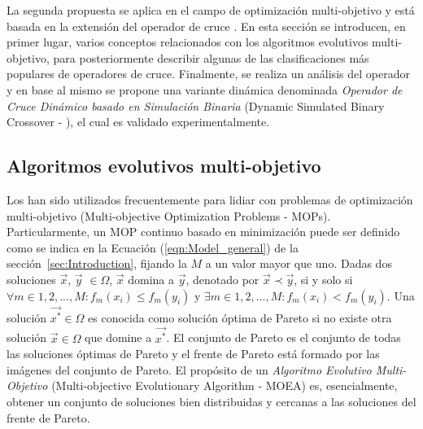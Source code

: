 La segunda propuesta se aplica en el campo de optimización multi-objetivo y está basada en la extensión del operador de
cruce \SBX{}.
%
En esta sección se introducen, en primer lugar, varios conceptos relacionados con los algoritmos evolutivos multi-objetivo, 
para posteriormente describir algunas de las clasificaciones más populares de operadores de cruce.
%
Finalmente, se realiza un análisis del operador \SBX{} y en base al mismo se propone una variante dinámica denominada 
\textit{Operador de Cruce Dinámico basado en Simulación Binaria} (Dynamic Simulated Binary Crossover - \DSBX{}), el cual
es validado experimentalmente.

\subsection{Algoritmos evolutivos multi-objetivo}

Los \EAS{} han sido utilizados frecuentemente para lidiar con problemas de optimización multi-objetivo (Multi-objective Optimization Problems - MOPs).
%
Particularmente, un MOP continuo basado en minimización puede ser definido como se indica en la Ecuación (\ref{eqn:Model_general}) de la sección~\ref{sec:Introduction}, fijando la $M$
a un valor mayor que uno.
%
Dadas dos soluciones $\vec{x}$, $\vec{y}$ $\in \Omega$, $\vec{x}$ domina a $\vec{y}$, denotado por $\vec{x} \prec \vec{y}$, 
si y solo si $\forall m \in {1,2,...,M} : f_m(x_i) \leq f_m(y_i)$ y $\exists m \in {1,2,...,M} : f_m(x_i) < f_m(y_i)$.
%
Una solución $\vec{x^*} \in \Omega$ es conocida como solución óptima de Pareto si no existe otra solución $\vec{x} \in \Omega$ que domine a $\vec{x^*}$.
%
El conjunto de Pareto es el conjunto de todas las soluciones óptimas de Pareto y el frente de Pareto está formado por las imágenes del conjunto de Pareto.
%
El propósito de un \textit{Algoritmo Evolutivo Multi-Objetivo} (Multi-objective Evolutionary Algorithm - MOEA) es, esencialmente, obtener 
un conjunto de soluciones bien distribuidas y cercanas a las soluciones del frente de Pareto.

